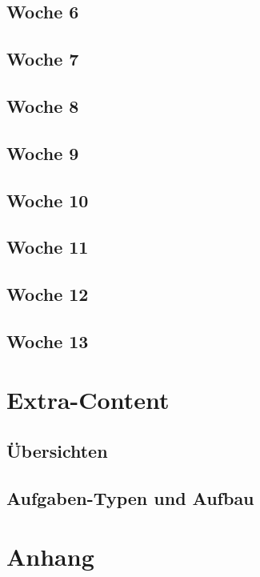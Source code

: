     \chapter{Woche 6}\label{ch:woche-6}
    
    
    \chapter{Woche 7}\label{ch:woche-7}
    
    
    \chapter{Woche 8}\label{ch:woche-8}
    
    
    \chapter{Woche 9}\label{ch:woche-9}
    
    
    \chapter{Woche 10}\label{ch:woche-10}
    
    
    \chapter{Woche 11}\label{ch:woche-11}
    
    \chapter{Woche 12}\label{ch:woche-12}
    
    \chapter{Woche 13}\label{ch:woche-13}
    

    \part{Extra-Content}\label{part:extra-content}

    \chapter{Übersichten}\label{ch:ubersichten}
    
    
    \chapter{Aufgaben-Typen und Aufbau}\label{ch:aufgaben-typen-und-aufbau}
    



    \part{Anhang}\label{part:anhang}
    \printglossary[type=symbolslist,style=symbunitlong]   %
    \printglossary
    \printindex



